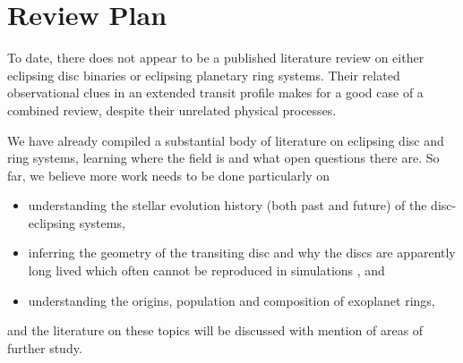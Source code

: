 \documentclass{article}
\begin{document}
\section{Review Plan}
To date, there does not appear to be a published literature review on either eclipsing disc binaries or eclipsing planetary ring systems. Their related observational clues in an extended transit profile makes for a good case of a combined review, despite their unrelated physical processes. 

We have already compiled a substantial body of literature on eclipsing disc and ring systems, learning where the field is and what open questions there are.
So far, we believe more work needs to be done particularly on
\begin{itemize}
    \item understanding the stellar evolution history (both past and future) of the disc-eclipsing systems,
    \item inferring the geometry of the transiting disc and why the discs are apparently long lived which often cannot be reproduced in simulations  \citep[e.g.][]{Zhou2018ApJ}, and
    \item understanding the origins, population and composition of exoplanet rings, 
\end{itemize}
and the literature on these topics will be discussed with mention of areas of further study.

\end{document}
